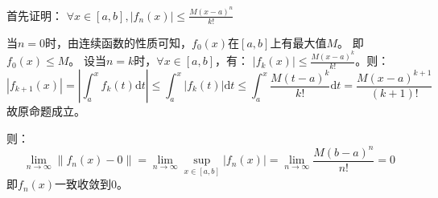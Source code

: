 \begin{solution}
    首先证明： \(\forall x \in [a,b], \left\vert f_{n}(x) \right\vert \le
    \frac{M(x-a)^{n}}{k!} \)

    当\(n=0\)时，由连续函数的性质可知，\(f_{0}(x)\)在\([a,b]\)上有最大值\(M\)。
    即\(f_{0}(x)\le M\)。
    设当\(n=k\)时，\(\forall x \in [a,b]\)，有： \(\left\vert f_{k}(x)
        \right\vert \le
    \frac{M(x-a)^{k}}{k!}\)。则：
    \[
        \left\vert f_{k+1}(x) \right\vert
        = \left\vert \int_{a}^{x} f_{k}(t) \mathrm{d}t \right\vert
        \le \int_{a}^{x} \left\vert f_{k}(t) \right\vert \mathrm{d}t
        \le \int_{a}^{x} \frac{M(t-a)^{k}}{k!} \mathrm{d}t =
        \frac{M(x-a)^{k+1}}{(k+1)!}
    \]
    故原命题成立。

    则：
    \[
        \lim_{n \to \infty} \left\lVert f_{n}(x) - 0 \right\rVert
        =\lim_{n \to \infty} \sup_{x \in [a,b]} \left\vert f_{n}(x)
        \right\vert = \lim_{n \to \infty} \frac{M(b-a)^{n}}{n!} = 0
    \]
    即\(f_{n}(x)\)一致收敛到\(0\)。
\end{solution}
